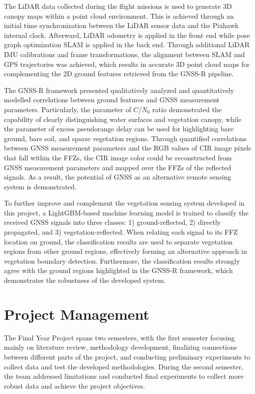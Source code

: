\documentclass[12pt, a4paper]{article}
\begin{document}
The LiDAR data collected during the flight missions is used to generate 3D
canopy maps within a point cloud environment. This is achieved through an
initial time synchronization between the LiDAR sensor data and the Pixhawk
internal clock. Afterward, LiDAR odometry is applied in the front end while pose
graph optimization SLAM is applied in the back end. Through additional LiDAR IMU
calibrations and frame transformations, the alignment between SLAM and GPS
trajectories was achieved, which results in accurate 3D point cloud maps for
complementing the 2D ground features retrieved from the GNSS-R pipeline.

The GNSS-R framework presented qualitatively analyzed and quantitatively
modelled correlations between ground features and GNSS measurement parameters.
Particularly, the parameter of $C/N_0$ ratio demonstrated the capability of
clearly distinguishing water surfaces and vegetation canopy, while the parameter
of excess pseudorange delay can be used for highlighting bare ground, bare soil,
and sparse vegetation regions. Through quantified correlations between GNSS
measurement parameters and the RGB values of CIR image pixels that fall within
the FFZs, the CIR image color could be reconstructed from GNSS measurement
parameters and mapped over the FFZs of the reflected signals. As a result, the
potential of GNSS as an alternative remote sensing system is demonstrated. 

To further improve and complement the vegetation sensing system developed in
this project, a LightGBM-based machine learning model is trained to classify the
received GNSS signals into three classes: 1) ground-reflected, 2) directly
propagated, and 3) vegetation-reflected. When relating each signal to its FFZ
location on ground, the classification results are used to separate vegetation
regions from other ground regions, effectively forming an alternative approach
in vegetation boundary detection. Furthermore, the classification results
strongly agree with the ground regions highlighted in the GNSS-R framework,
which demonstrates the robustness of the developed system.


\section{Project Management}
The Final Year Project spans two semesters, with the first semester focusing mainly
on literature review, methodology development, finalizing connections between
different parts of the project, and conducting preliminary experiments to
collect data and test the developed methodologies. During the second semester,
the team addressed limitations and conducted final experiments to collect
more robust data and achieve the project objectives.
\end{document}
